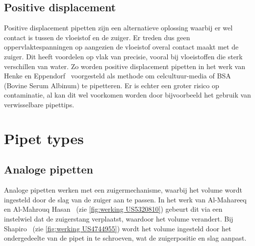 \subsection{Positive displacement}
Positive displacement pipetten zijn een alternatieve oplossing waarbij er wel contact is tussen de vloeistof en de zuiger. Er treden dus geen oppervlaktespanningen op aangezien de vloeistof overal contact maakt met de zuiger. Dit heeft voordelen op vlak van precisie, vooral bij vloeistoffen die sterk verschillen van water. Zo worden positive displacement pipetten in het werk van Henke en Eppendorf\ \cite{RN37} voorgesteld als methode om celcultuur-media of BSA (Bovine Serum Albinum) te pipetteren. Er is echter een groter risico op contaminatie, al kan dit wel voorkomen worden door bijvoorbeeld het gebruik van verwisselbare pipettips.

\section{Pipet types}
\subsection{Analoge pipetten}\label{sec: Analoge pipetten}
Analoge pipetten werken met een zuigermechanisme, waarbij het volume wordt ingesteld door de slag van de zuiger aan te passen. In het werk van Al-Mahareeq en Al-Mahrouq Hasan\ \cite{RN17} (zie \autoref{fig:werking US5320810}) gebeurt dit via een instelwiel dat de zuigerstang verplaatst, waardoor het volume verandert. Bij Shapiro\ \cite{RN16} (zie \autoref{fig:werking US4744955}) wordt het volume ingesteld door het ondergedeelte van de pipet in te schroeven, wat de zuigerpositie en slag aanpast.

